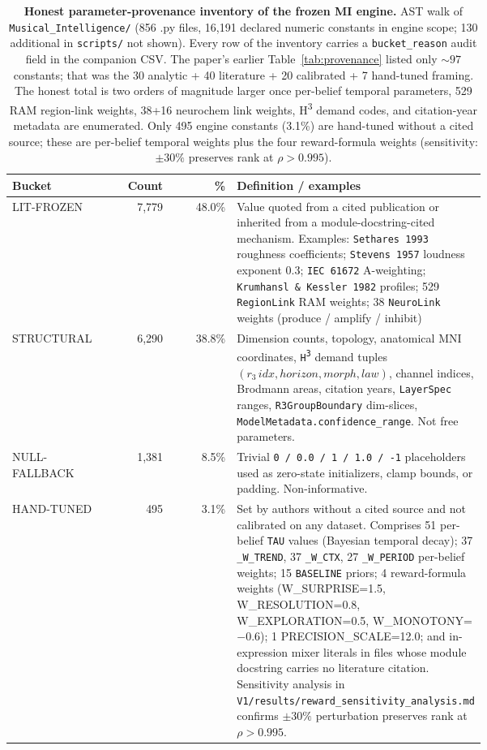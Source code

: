 \begin{table}[t]
\centering
\caption{\textbf{Honest parameter-provenance inventory of the frozen MI engine.}
AST walk of \texttt{Musical\_Intelligence/} (856 .py files, 16{,}191 declared
numeric constants in engine scope; 130 additional in \texttt{scripts/} not shown).
Every row of the inventory carries a \texttt{bucket\_reason} audit field in the
companion CSV. The paper's earlier Table~\ref{tab:provenance} listed only
\(\sim 97\) constants; that was the 30 analytic + 40 literature + 20 calibrated
+ 7 hand-tuned framing. The honest total is two orders of magnitude larger once
per-belief temporal parameters, 529 RAM region-link weights, 38+16 neurochem
link weights, H\textsuperscript{3} demand codes, and citation-year metadata are
enumerated. Only 495 engine constants (3.1\%) are hand-tuned without a cited
source; these are per-belief temporal weights plus the four reward-formula
weights (sensitivity: \(\pm 30\%\) preserves rank at \(\rho > 0.995\)).}
\label{tab:provenance_honest}
\small
\begin{tabular}{p{0.16\linewidth}rrp{0.52\linewidth}}
\toprule
Bucket & Count & \% & Definition / examples \\
\midrule
LIT-FROZEN & 7,779 & 48.0\% & Value quoted from a cited publication or inherited from a module-docstring-cited mechanism. Examples: \texttt{Sethares 1993} roughness coefficients; \texttt{Stevens 1957} loudness exponent 0.3; \texttt{IEC 61672} A-weighting; \texttt{Krumhansl \& Kessler 1982} profiles; 529 \texttt{RegionLink} RAM weights; 38 \texttt{NeuroLink} weights (produce / amplify / inhibit) \\
STRUCTURAL & 6,290 & 38.8\% & Dimension counts, topology, anatomical MNI coordinates, \texttt{H\textsuperscript{3}} demand tuples \((r_3\,idx, horizon, morph, law)\), channel indices, Brodmann areas, citation years, \texttt{LayerSpec} ranges, \texttt{R3GroupBoundary} dim-slices, \texttt{ModelMetadata.confidence\_range}. Not free parameters. \\
NULL-FALLBACK & 1,381 & 8.5\% & Trivial \texttt{0 / 0.0 / 1 / 1.0 / -1} placeholders used as zero-state initializers, clamp bounds, or padding. Non-informative. \\
HAND-TUNED & 495 & 3.1\% & Set by authors without a cited source and not calibrated on any dataset. Comprises 51 per-belief \texttt{TAU} values (Bayesian temporal decay); 37 \texttt{\_W\_TREND}, 37 \texttt{\_W\_CTX}, 27 \texttt{\_W\_PERIOD} per-belief weights; 15 \texttt{BASELINE} priors; 4 reward-formula weights (W\_SURPRISE=1.5, W\_RESOLUTION=0.8, W\_EXPLORATION=0.5, W\_MONOTONY=\(-\)0.6); 1 PRECISION\_SCALE=12.0; and in-expression mixer literals in files whose module docstring carries no literature citation. Sensitivity analysis in \texttt{V1/results/reward\_sensitivity\_analysis.md} confirms \(\pm 30\%\) perturbation preserves rank at \(\rho > 0.995\). \\

\end{tabular}
\end{table}

